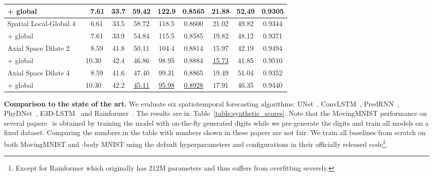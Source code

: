 \documentclass{article}
\newcommand{\bgray}[1]{\colorbox{myGray}{#1}}
\newcommand{\tabref}[1]{Table~\ref{#1}}
\renewcommand{\paragraph}[1]{\textbf{#1. }}
\def\nbody{-body MNIST}
\begin{document}
\begin{table}[!tb]
\begin{center}
{\begin{tabular}{l|c|c|ccc|ccc}
	+ global                &\ \ 7.61	    & 33.7	    & \bgray{59.42}         & 122.9				    & 0.8565			        & \bgray{21.88}		& \bgray{52.49}		& \bgray{0.9305}		\\
	\midrule
	Spatial Local-Global 4  &\ \ 6.61	    & 33.5	    & 58.72				    & 118.5				    & \bgray{0.8600}	        & 21.02				& 49.82				& 0.9344				\\
	+ global                &\ \ 7.61	    & 33.9	    & \bgray{54.84}         & \bgray{115.5}         & 0.8585			        & \bgray{19.82}		& \bgray{48.12}		& \bgray{0.9371}		\\
	\midrule
	Axial Space Dilate 2    &\ \ 8.59	    & 41.8	    & 50.11				    & 104.4				    & 0.8814			        & 15.97				& 42.19				& 0.9494				\\
	+ global                & 10.30         & 42.4   	& \bgray{46.86}	        & \bgray{98.95}	        & \bgray{0.8884}	        & \bgray{\underline{15.73}}& \bgray{41.85}& \bgray{0.9510}		\\
	\midrule
	Axial Space Dilate 4    &\ \ 8.59	    & 41.6		& 47.40				    & 99.31				    & 0.8865			        & 19.49				& 51.04				& 0.9352				\\
	+ global                & 10.30	        & 42.2	    & \bgray{\underline{45.11}}& \bgray{\underline{95.98}}& \bgray{\underline{0.8928}}& \bgray{17.91}& \bgray{46.35}	& \bgray{0.9440}				\\
	\bottomrule[1.5pt]
	\end{tabular}
	} \end{center}
	\vspace{-1.5em}
\end{table}

\paragraph{Comparison to the state of the art}
We evaluate six spatiotemporal forecasting algorithms: UNet~\cite{veillette2020sevir}, ConvLSTM~\cite{shi2015convolutional}, PredRNN~\cite{wang2022predrnn}, PhyDNet~\cite{guen2020disentangling}, E3D-LSTM~\cite{wang2018eidetic} and Rainformer~\cite{bai2022rainformer}. The results are in~\tabref{table:synthetic_scores}. Note that the MovingMNIST performance on several papers~\cite{guen2020disentangling} is obtained by training the model with on-the-fly generated digits while we pre-generate the digits and train all models on a fixed dataset. Comparing the numbers in the table with numbers shown in these papers are not fair. We train all baselines from scratch on both MovingMNIST and \nbody{} using the default hyperparameters and configurations in their officially released code\footnote{Except for Rainformer which originally has 212M parameters and thus suffers from overfitting severely.}.
\end{document}
